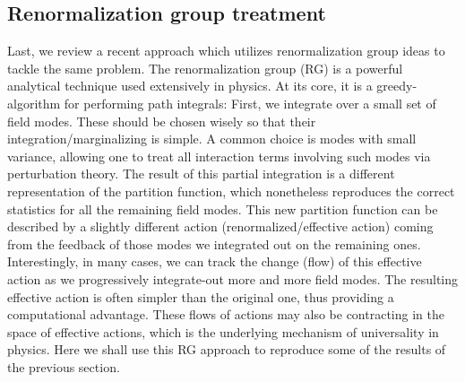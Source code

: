\subsection{Renormalization group treatment}
Last, we review a recent approach \citep{howard2024} which utilizes renormalization group ideas to tackle the same problem. The renormalization group (RG) is a powerful analytical technique used extensively in physics. At its core, it is a greedy-algorithm for performing path integrals: First, we integrate over a small set of field modes. These should be chosen wisely so that their integration/marginalizing is simple. A common choice is modes with small variance, allowing one to treat all interaction terms involving such modes via perturbation theory. The result of this partial integration is a different representation of the partition function, which nonetheless reproduces the correct statistics for all the remaining field modes. This new partition function can be described by a slightly different action (renormalized/effective action) coming from the feedback of those modes we integrated out on the remaining ones. Interestingly, in many cases, we can track the change (flow) of this effective action as we progressively integrate-out more and more field modes. The resulting effective action is often simpler than the original one, thus providing a computational advantage. These flows of actions may also be contracting in the space of effective actions, which is the underlying mechanism of universality in physics. Here we shall use this RG approach to reproduce some of the results of the previous section. 

